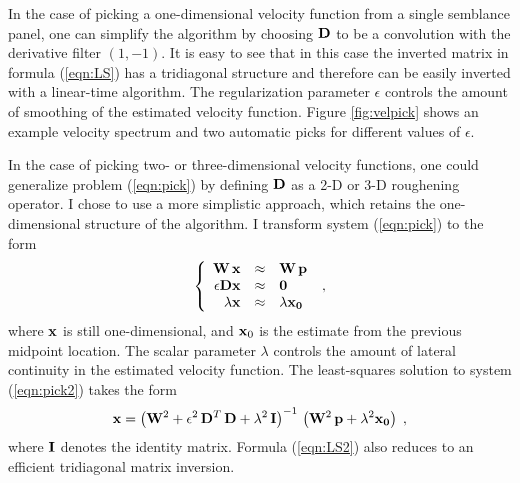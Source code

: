 
In the case of picking a one-dimensional velocity function from a single
semblance panel, one can simplify the algorithm by choosing $\bold{D}$ to be a
convolution with the derivative filter $(1,-1)$. It is easy to see that in
this case the inverted matrix in formula (\ref{eqn:LS}) has a tridiagonal
structure and therefore can be easily inverted with a linear-time algorithm.
The regularization parameter $\epsilon$ controls the amount of smoothing of
the estimated velocity function.  Figure \ref{fig:velpick} shows an example
velocity spectrum and two automatic picks for different values of $\epsilon$.


\par
In the case of picking two- or three-dimensional velocity functions,
one could generalize problem (\ref{eqn:pick}) by defining $\bold{D}$
as a 2-D or 3-D roughening operator. I chose to use a more simplistic
approach, which retains the one-dimensional structure of the algorithm. 
I transform system (\ref{eqn:pick}) to the form
\begin{equation}
  \label{eqn:pick2}
  \left\{\begin{array}{rcl}
      \bold{W}\,\bold{x} & \approx & \bold{W}\,\bold{p} \\
      \epsilon \bold{D} \bold{x} & \approx & \bold{0} \\
      \lambda \bold{x} & \approx & \lambda \bold{x_0}
    \end{array}\right.\;,
\end{equation}
where $\bold{x}$ is still one-dimensional, and $\bold{x}_0$ is the
estimate from the previous midpoint location. The scalar parameter
$\lambda$ controls the amount of lateral continuity in the estimated
velocity function. The least-squares solution to system
(\ref{eqn:pick2}) takes the form
\begin{equation}
  \label{eqn:LS2}
  \bold{x} = 
  \left(\bold{W}^2 + \epsilon^2\,\bold{D}^T\,\bold{D}
    + \lambda^2\,\bold{I}\right)^{-1}\,
  \left(\bold{W}^2\,\bold{p} + \lambda^2 \bold{x_0}\right)\;,
\end{equation}
where $\bold{I}$ denotes the identity matrix. Formula (\ref{eqn:LS2})
also reduces to an efficient tridiagonal matrix inversion.

